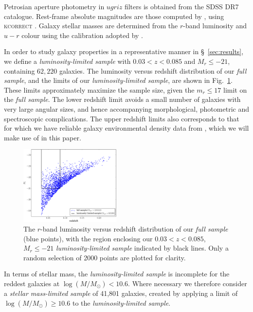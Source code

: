 \documentclass[useAMS,usenatbib]{mn2e}
\begin{document}
Petrosian aperture photometry in $ugriz$ filters is obtained from the SDSS DR7 catalogue. Rest-frame absolute magnitudes are those computed by \citet{Bamford_09}, using \textsc{kcorrect} \citep{Blanton_07}. Galaxy stellar masses are determined from the $r$-band luminosity and $u-r$ colour using the calibration adopted by \citet{Baldry_06}.

In order to study galaxy properties in a representative manner in \S~\ref{sec:results}, we define a \textit{luminosity-limited sample} with $0.03<z<0.085$ and $M_r \le -21$, containing $62,220$ galaxies. The luminosity versus redshift distribution of our \textit{full sample}, and the limits of our \textit{luminosity-limited sample}, are shown in Fig.~\ref{fig:vl_sample}.  These limits approximately maximize the sample size, given the $m_r \le 17$ limit on the \textit{full sample}. The lower redshift limit avoids a small number of galaxies with very large angular sizes, and hence accompanying morphological, photometric and spectroscopic complications. The upper redshift limits also corresponds to that for which we have reliable galaxy environmental density data from \cite{Baldry_06}, which we will make use of in this paper.  

\begin{figure}
		\centering
		\includegraphics[width=0.45\textwidth]{Images/Data/volume_limited_sample.pdf}
    \caption{The $r$-band luminosity versus redshift distribution of our \textit{full sample} (blue points), with the region enclosing our $0.03<z<0.085$, $M_r  \leq -21$ \textit{luminosity-limited sample} indicated by black lines. Only a random selection of 2000 points are plotted for clarity.
		\label{fig:vl_sample}}
\end{figure}

In terms of stellar mass, the \textit{luminosity-limited sample} is incomplete for the reddest galaxies at $\log (M/M_{\odot}) < 10.6$. Where necessary we therefore consider a \textit{stellar mass-limited sample} of 41,801 galaxies, created by applying a limit of $\log (M/M_{\odot}) \geq 10.6$ to the \textit{luminosity-limited sample}.
\end{document}
